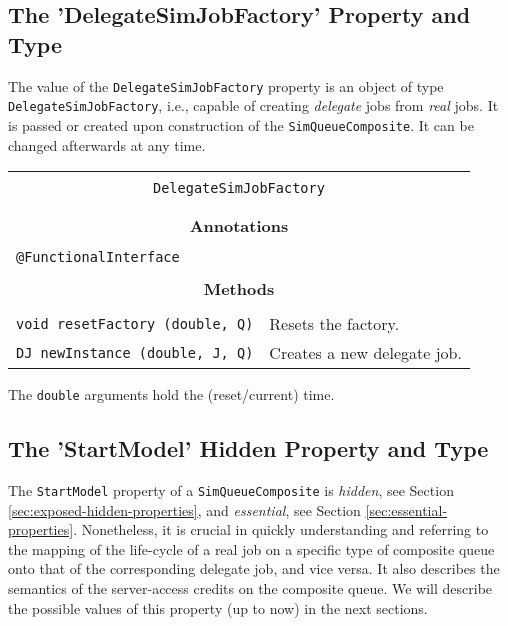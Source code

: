 \subsection{The 'DelegateSimJobFactory' Property and Type}

The value of the \lstinline|DelegateSimJobFactory| property is an object of type \lstinline|DelegateSimJobFactory|,
i.e.,
 capable of creating {\em delegate\/} jobs from {\em real\/} jobs.
It is passed or created upon construction
  of the \lstinline|SimQueueComposite|.
It can be changed afterwards at any time.
  
\begin{tabular}{|l|l|l|l|}
	\hline
	\multicolumn{4}{|c|}{} \\
	\multicolumn{4}{|c|}{\lstinline[basicstyle=\large]{DelegateSimJobFactory}} \\
	\multicolumn{4}{|c|}{} \\
	\hline
	\multicolumn{4}{|c|}{} \\
	\multicolumn{4}{|c|}{\bf Annotations} \\
	\multicolumn{4}{|c|}{} \\
	\hline
	\multicolumn{4}{|l|}{\lstinline|@FunctionalInterface|} \\
	\hline
	\multicolumn{4}{|c|}{} \\
	\multicolumn{4}{|c|}{\bf Methods} \\
	\multicolumn{4}{|c|}{} \\
	\hline
	\multicolumn{3}{|l|}{\lstinline|void resetFactory (double, Q)|} & Resets the factory. \\
	\hline
	\multicolumn{3}{|l|}{\lstinline|DJ newInstance (double, J, Q)|} & Creates a new delegate job. \\
	\hline
\end{tabular}

The \lstinline|double| arguments hold the (reset/current) time.

\subsection{The 'StartModel' Hidden Property and Type}
\label{sec:start-model}

The \lstinline|StartModel| property of a \lstinline|SimQueueComposite| is {\em hidden},
  see Section \ref{sec:exposed-hidden-properties},
  and {\em essential}, see Section \ref{sec:essential-properties}.
Nonetheless, it is crucial in quickly understanding and referring to
the mapping of the life-cycle of a real job on a specific type of composite queue
onto that of the corresponding delegate job,
and vice versa.
It also describes the semantics of the
  server-access credits on the composite queue.
We will describe the possible values of this property (up to now) in the next sections.


